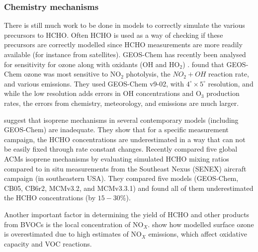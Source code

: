     \subsubsection{Chemistry mechanisms}
      \label{LR:Models:Uncert:Chemistry}
      There is still much work to be done in models to correctly simulate the various precursors to HCHO.
      Often HCHO is used as a way of checking if these precursors are correctly modelled since HCHO measurements are more readily available (for instance from satellites).
      GEOS-Chem has recently been analysed for sensitivity for ozone along with oxidants (OH and HO$_2$) \citep{Christian2017}.
      \cite{Christian2017} found that GEOS-Chem ozone was most sensitive to NO$_2$ photolysis, the $NO_2 + OH$ reaction rate, and various emissions.
      They used GEOS-Chem v9-02, with $4^{\circ} \times 5^{\circ}$ resolution, and while the low resolution adds errors in OH concentrations and O$_3$ production rates, the errors from chemistry, meteorology, and emissions are much larger.
      
      \cite{Marvin2017} suggest that isoprene mechanisms in several contemporary models (including GEOS-Chem) are inadequate. 
      They show that for a specific measurement campaign, the HCHO concentrations are underestimated in a way that can not be easily fixed through rate constant changes.
      Recently \cite{Marvin2017} compared five global ACMs isoprene mechanisms by evaluating simulated HCHO mixing ratios compared to in situ measurements from the Southeast Nexus (SENEX) aircraft campaign (in southeastern USA).
      They compared five models (GEOS-Chem, CB05, CB6r2, MCMv3.2, and MCMv3.3.1) and found all of them underestimated the HCHO concentrations (by $15 - 30\%$).
      
      Another important factor in determining the yield of HCHO and other products from BVOCs is the local concentration of NO$_X$.
      \cite{Travis2016} show how modelled surface ozone is overestimated due to high estimates of  NO$_X$ emissions, which affect oxidative capacity and VOC reactions.
    
    
